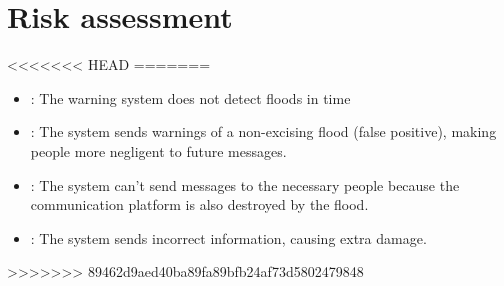 \section{Risk assessment}

<<<<<<< HEAD
=======
\begin{itemize}
	\item {}: The warning system does not detect floods in time
	\item {}: The system sends warnings of a non-excising flood (false positive), making people more negligent to future messages.
	\item {}: The system can't send messages to the necessary people because the communication platform is also destroyed by the flood.
	\item {}: The system sends incorrect information, causing extra damage.
\end{itemize}
>>>>>>> 89462d9aed40ba89fa89bfb24af73d5802479848
